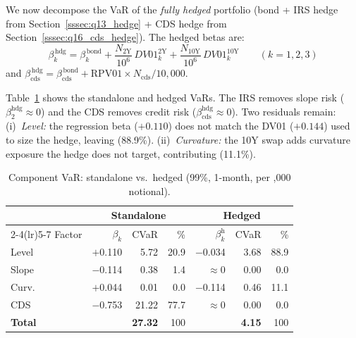 \documentclass[11pt,a4paper]{article}
\begin{document}
We now decompose the VaR of the \textit{fully hedged}
portfolio (bond + IRS hedge from Section~\ref{sssec:q13_hedge}
+ CDS hedge from Section~\ref{sssec:q16_cds_hedge}).
The hedged betas are:
\begin{equation}
  \beta_k^{\,\mathrm{hdg}}
  = \beta_k^{\,\mathrm{bond}}
    + \frac{N_{2\mathrm{Y}}}{10^{6}} \, DV01_k^{2\mathrm{Y}}
    + \frac{N_{10\mathrm{Y}}}{10^{6}} \, DV01_k^{10\mathrm{Y}}
  \qquad (k = 1,2,3)
\end{equation}
and $\beta_{\mathrm{cds}}^{\,\mathrm{hdg}}
= \beta_{\mathrm{cds}}^{\,\mathrm{bond}}
+ \mathrm{RPV01} \times N_{\mathrm{cds}} / 10{,}000$.

Table~\ref{tab:q21_hedged} shows the standalone and hedged VaRs.
The IRS removes slope risk ($\beta_2^{\mathrm{hdg}} \approx 0$)
and the CDS removes credit risk
($\beta_{\mathrm{cds}}^{\mathrm{hdg}} \approx 0$).
Two residuals remain:
(i)~\emph{Level:} the regression beta ($+0.110$) does not match
the DV01 ($+0.144$) used to size the hedge, leaving 
(88.9\%).
(ii)~\emph{Curvature:} the 10Y swap adds curvature exposure the
hedge does not target, contributing  (11.1\%).

\begin{table}
  \vspace{-10pt}
    \centering\footnotesize
    \setlength{\tabcolsep}{2.5pt}
    \caption{Component VaR: standalone vs.\ hedged
      (99\%, 1-month, per ,000 notional).}
    \label{tab:q21_hedged}
    \vspace{2pt}
    \begin{tabular}{@{}lrrrrrr@{}}
      \toprule
      & \multicolumn{3}{c}{Standalone} &
        \multicolumn{3}{c}{Hedged} \\
      \cmidrule(lr){2-4}\cmidrule(lr){5-7}
      Factor &
      $\beta_k$ & CVaR & \% &
      $\beta_k^{\mathrm{h}}$ & CVaR & \% \\
      \midrule
      Level
        & $+$0.110 & 5.72 & 20.9
        & $-$0.034 & 3.68 & 88.9 \\
      Slope
        & $-$0.114 & 0.38 & 1.4
        & $\approx$0 & 0.00 & 0.0 \\
      Curv.
        & $+$0.044 & 0.01 & 0.0
        & $-$0.114 & 0.46 & 11.1 \\
      CDS
        & $-$0.753 & 21.22 & 77.7
        & $\approx$0 & 0.00 & 0.0 \\
      \midrule
      \textbf{Total}
        & & \textbf{27.32} & 100
        & & \textbf{4.15} & 100 \\
      \bottomrule
    \end{tabular}
  \vspace{-8pt}
\end{table}
\end{document}
